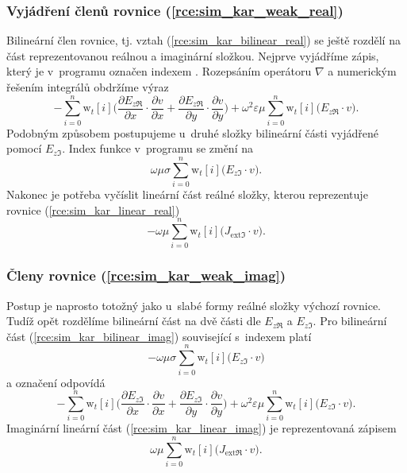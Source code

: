 \subsubsection*{Vyjádření členů rovnice (\ref{rce:sim_kar_weak_real})}
Bilineární člen rovnice, tj. vztah (\ref{rce:sim_kar_bilinear_real}) se ještě rozdělí na část reprezentovanou reálnou a imaginární složkou. Nejprve vyjádříme zápis, který je v~programu označen indexem . Rozepsáním operátoru $\nabla$ a numerickým řešením integrálů obdržíme výraz
\begin{equation}
	-\sum_{i=0}^{n}\mathrm{w}_{t}[i]\bigg(\frac{\partial E_{z\Re}}{\partial x}\cdot \frac{\partial v}{\partial x} + \frac{\partial E_{z\Re}}{\partial y}\cdot \frac{\partial v}{\partial y} \bigg) + \omega^{2}\varepsilon\mu\sum_{i=0}^{n}\mathrm{w}_{t}[i]\bigg(E_{z\Re}\cdot v\bigg).
	\label{rce:sim_kar_weak_real_real_num} 
\end{equation}
Podobným způsobem postupujeme u~druhé složky bilineární části vyjádřené pomocí $E_{z\Im}$. Index funkce v~programu se změní na 
\begin{equation}
 \omega\mu\sigma\sum_{i=0}^{n}\mathrm{w}_{t}[i]\bigg(E_{z\Im}\cdot v\bigg).
	\label{rce:sim_kar_weak_real_imag_num} 
\end{equation}
Nakonec je potřeba vyčíslit lineární část reálné složky, kterou reprezentuje rovnice (\ref{rce:sim_kar_linear_real})
\begin{equation}
 -\omega\mu\sum_{i=0}^{n}\mathrm{w}_{t}[i]\bigg(J_{\mathrm{ext}\Im}\cdot v\bigg).
	\label{rce:sim_kar_linear_real_num} 
\end{equation}


\subsubsection*{Členy rovnice (\ref{rce:sim_kar_weak_imag})}
Postup je naprosto totožný jako u~slabé formy reálné složky výchozí rovnice. Tudíž opět rozdělíme bilineární část na dvě části dle $E_{z\Re}$ a $E_{z\Im}$. Pro bilineární část (\ref{rce:sim_kar_bilinear_imag}) související s~indexem  platí
\begin{equation}
 -\omega\mu\sigma\sum_{i=0}^{n}\mathrm{w}_{t}[i]\bigg(E_{z\Im}\cdot v\bigg)
	\label{rce:sim_kar_weak_imag_real_num} 
\end{equation}
a označení  odpovídá
\begin{equation}
	-\sum_{i=0}^{n}\mathrm{w}_{t}[i]\bigg(\frac{\partial E_{z\Im}}{\partial x}\cdot \frac{\partial v}{\partial x} + \frac{\partial E_{z\Im}}{\partial y}\cdot \frac{\partial v}{\partial y} \bigg) + \omega^{2}\varepsilon\mu\sum_{i=0}^{n}\mathrm{w}_{t}[i]\bigg(E_{z\Im}\cdot v\bigg).
	\label{rce:sim_kar_weak_imag_imag_num} 
\end{equation}
Imaginární lineární část (\ref{rce:sim_kar_linear_imag}) je reprezentovaná zápisem
\begin{equation}
 \omega\mu\sum_{i=0}^{n}\mathrm{w}_{t}[i]\bigg(J_{\mathrm{ext}\Re}\cdot v\bigg).
	\label{rce:sim_kar_linear_imag_num} 
\end{equation}

